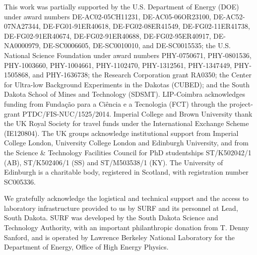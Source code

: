 \documentclass[a4paper,11pt]{article}
\begin{document}
\acknowledgments

This work was partially supported by the U.S. Department of Energy (DOE) under award numbers DE-AC02-05CH11231, DE-AC05-06OR23100, DE-AC52-07NA27344, DE-FG01-91ER40618, DE-FG02-08ER41549, DE-FG02-11ER41738, DE-FG02-91ER40674, DE-FG02-91ER40688, DE-FG02-95ER40917, DE-NA0000979, DE-SC0006605, DE-SC0010010, and DE-SC0015535; the U.S. National Science Foundation under award numbers PHY-0750671, PHY-0801536, PHY-1003660, PHY-1004661, PHY-1102470, PHY-1312561, PHY-1347449, PHY-1505868, and PHY-1636738; the Research Corporation grant RA0350; the Center for Ultra-low Background Experiments in the Dakotas (CUBED); and the South Dakota School of Mines and Technology (SDSMT). LIP-Coimbra acknowledges funding from Funda\c{c}\~{a}o para a Ci\^{e}ncia e a Tecnologia (FCT) through the project-grant PTDC/FIS-NUC/1525/2014. Imperial College and Brown University thank the UK Royal Society for travel funds under the International Exchange Scheme (IE120804). The UK groups acknowledge institutional support from Imperial College London, University College London and Edinburgh University, and from the Science \& Technology Facilities Council for PhD studentships ST/K502042/1 (AB), ST/K502406/1 (SS) and ST/M503538/1 (KY). The University of Edinburgh is a charitable body, registered in Scotland, with registration number SC005336.

We gratefully acknowledge the logistical and technical support and the access to laboratory infrastructure provided to us by SURF and its personnel at Lead, South Dakota. SURF was developed by the South Dakota Science and Technology Authority, with an important philanthropic donation from T. Denny Sanford, and is operated by Lawrence Berkeley National Laboratory for the Department of Energy, Office of High Energy Physics.



\end{document}
